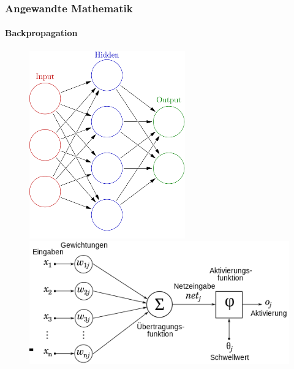 \documentclass{beamer}
\begin{document}
\begin{frame}
    \frametitle{Angewandte Mathematik}
\framesubtitle{Backpropagation}
 \begin{figure}[!tbp]
  \centering
  \begin{minipage}[b]{0.45\textwidth}
    \includegraphics[width=0.6\textwidth]{images/499px-Colored_neural_network}
    \caption{}
  \end{minipage}
  \hfill
  \begin{minipage}[b]{0.45\textwidth}
    \includegraphics[width=1.0\textwidth]{images/500px-NeuronModel_deutsch}
    \caption{}
  \end{minipage}
\end{figure}
 \end{frame}
\end{document}
